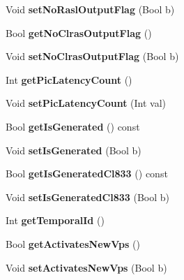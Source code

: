 \begin{DoxyCompactItemize}
\mbox{\label{class_t_com_pic_ae372624b40713a0fe034fa9be5ef036a}} 
Void {\bfseries set\+No\+Rasl\+Output\+Flag} (Bool b)
\item 
\mbox{\label{class_t_com_pic_ae8b0401efe2825b1471859b33b8bb7d0}} 
Bool {\bfseries get\+No\+Clras\+Output\+Flag} ()
\item 
\mbox{\label{class_t_com_pic_a527d3bc2504effe35eb012e33051fb15}} 
Void {\bfseries set\+No\+Clras\+Output\+Flag} (Bool b)
\item 
\mbox{\label{class_t_com_pic_a03c97e77bee6923037895b2f1073898c}} 
Int {\bfseries get\+Pic\+Latency\+Count} ()
\item 
\mbox{\label{class_t_com_pic_af5783b3562acfe63b8c1134cb3ad0472}} 
Void {\bfseries set\+Pic\+Latency\+Count} (Int val)
\item 
\mbox{\label{class_t_com_pic_a8ae3ee18d71a0c2d8eac51a20090695f}} 
Bool {\bfseries get\+Is\+Generated} () const
\item 
\mbox{\label{class_t_com_pic_ac135a2e39f295dc38ef66f40a899606f}} 
Void {\bfseries set\+Is\+Generated} (Bool b)
\item 
\mbox{\label{class_t_com_pic_a59a00888d663fb3a9e0ed38d34680457}} 
Bool {\bfseries get\+Is\+Generated\+Cl833} () const
\item 
\mbox{\label{class_t_com_pic_afb7b99c565bcbe495eaba5e87de6ffb4}} 
Void {\bfseries set\+Is\+Generated\+Cl833} (Bool b)
\item 
\mbox{\label{class_t_com_pic_a1aa321955d7bc0ea64a9b192c56e88d7}} 
Int {\bfseries get\+Temporal\+Id} ()
\item 
\mbox{\label{class_t_com_pic_ac6c737910a48fc9c4986d2be782d8bf6}} 
Bool {\bfseries get\+Activates\+New\+Vps} ()
\item 
\mbox{\label{class_t_com_pic_aa07622fef2400e017532acc28a4878e3}} 
Void {\bfseries set\+Activates\+New\+Vps} (Bool b)

\end{DoxyCompactItemize}
